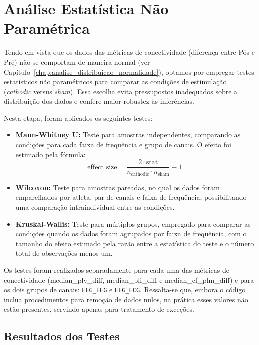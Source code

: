 \chapter{Análise Estatística Não Paramétrica}
\label{chap:analise_estatistica_np}

Tendo em vista que os dados das métricas de conectividade (diferença entre Pós e Pré) não se comportam de maneira normal (ver Capítulo~\ref{chap:analise_distribuicao_normalidade}), optamos por empregar testes estatísticos não paramétricos para comparar as condições de estimulação (\texorpdfstring{\textit{cathodic} versus \textit{sham}}{cathodic versus sham}). Essa escolha evita pressupostos inadequados sobre a distribuição dos dados e confere maior robustez às inferências.

Nesta etapa, foram aplicados os seguintes testes:
\begin{itemize}
    \item \textbf{Mann-Whitney U:} Teste para amostras independentes, comparando as condições para cada faixa de frequência e grupo de canais. O efeito foi estimado pela fórmula:
    \[
    \text{effect size} = \frac{2\cdot \text{stat}}{n_{\text{cathodic}} \cdot n_{\text{sham}}} - 1.
    \]
    \item \textbf{Wilcoxon:} Teste para amostras pareadas, no qual os dados foram emparelhados por atleta, par de canais e faixa de frequência, possibilitando uma comparação intraindividual entre as condições.
    \item \textbf{Kruskal-Wallis:} Teste para múltiplos grupos, empregado para comparar as condições quando os dados foram agrupados por faixa de frequência, com o tamanho do efeito estimado pela razão entre a estatística do teste e o número total de observações menos um.
\end{itemize}

Os testes foram realizados separadamente para cada uma das métricas de conectividade (median_plv_diff, median_pli_diff e median_cf_plm_diff) e para os dois grupos de canais: \texorpdfstring{\texttt{EEG\_EEG}}{EEG_EEG} e \texorpdfstring{\texttt{EEG\_ECG}}{EEG_ECG}. Ressalta-se que, embora o código inclua procedimentos para remoção de dados nulos, na prática esses valores não estão presentes, servindo apenas para tratamento de exceções.

\section{Resultados dos Testes}

